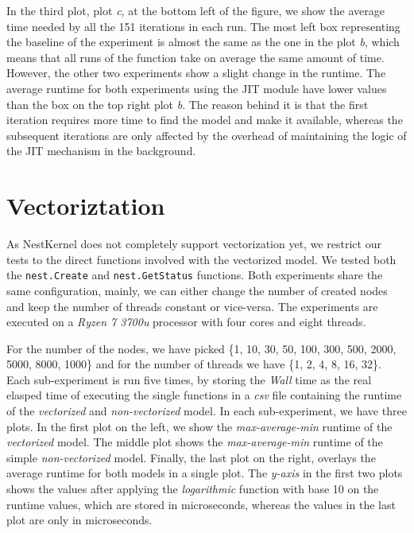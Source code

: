 In the third plot, plot \emph{c}, at the bottom left of the figure, we show the average time needed by all the 151 iterations in each run. The most left box representing the baseline of the experiment is almost the same as the one in the plot \emph{b}, which means that all runs of the function take on average the same amount of time. However, the other two experiments show a slight change in the runtime. The average runtime for both experiments using the JIT module have lower values than the box on the top right plot \emph{b}. The reason behind it is that the first iteration requires more time to find the model and make it available, whereas the subsequent iterations are only affected by the overhead of maintaining the logic of the JIT mechanism in the background.



\section{Vectoriztation}

As NestKernel does not completely support vectorization yet, we restrict our tests to the direct functions involved with the vectorized model. We tested both the \texttt{nest.Create} and \texttt{nest.GetStatus} functions. Both experiments share the same configuration, mainly, we can either change the number of created nodes and keep the number of threads constant or vice-versa. The experiments are executed on a \emph{Ryzen 7 3700u} processor with four cores and eight threads.

For the number of the nodes, we have picked \{1, 10, 30, 50, 100, 300, 500, 2000, 5000, 8000, 1000\} and for the number of threads we have \{1, 2, 4, 8, 16, 32\}. Each sub-experiment is run five times, by storing the \emph{Wall} time as the real elasped time of executing the single functions in a \emph{csv} file containing the runtime of the \emph{vectorized} and \emph{non-vectorized} model. In each sub-experiment, we have three plots. In the first plot on the left, we show the \emph{max-average-min} runtime of the \emph{vectorized} model. The middle plot shows the \emph{max-average-min} runtime of the simple \emph{non-vectorized} model. Finally, the last plot on the right, overlays the average runtime for both models in a single plot. The \emph{y-axis} in the first two plots shows the values after applying the \emph{logarithmic} function with base 10 on the runtime values, which are stored in microseconds, whereas the values in the last plot are only in microseconds.

